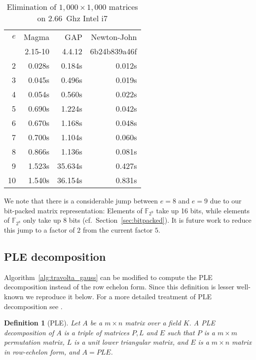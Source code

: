 \documentclass{sig-alternate}
\newcommand{\ring}[1]{\mathbb{#1}}
\newcommand{\F}{\ensuremath{\ring{F}}\xspace}
\newcommand{\mycomputer}{2.66~Ghz Intel i7\xspace}
\newtheorem{definition}{Definition}
\begin{document}
\begin{table}[ht]
\begin{small}
\begin{center}
\begin{tabular}{|r|r|r|r|}
\hline
 $e$ & Magma & GAP & Newton-John \\
     & {\footnotesize 2.15-10} & {\footnotesize 4.4.12} & {\footnotesize 6b24b839a46f}\\
\hline
 2 & 0.028s &  0.184s & 0.012s\\
 3 & 0.045s &  0.496s & 0.019s\\
 4 & 0.054s &  0.560s & 0.022s\\
 5 & 0.690s &  1.224s & 0.042s\\
 6 & 0.670s &  1.168s & 0.048s\\
 7 & 0.700s &  1.104s & 0.060s\\
 8 & 0.866s &  1.136s & 0.081s\\
 9 & 1.523s & 35.634s & 0.427s\\
10 & 1.540s & 36.154s & 0.831s\\
\hline
\end{tabular}
\end{center}
\end{small}
\caption{Elimination of $1,000 \times 1,000$ matrices on \mycomputer}
\label{tab:travolta_elim_times}
\end{table}

We note that there is a considerable jump between $e=8$ and $e=9$ due to our bit-packed matrix representation: Elements of $\F_{2^9}$ take up 16 bits, while elements of $\F_{2^8}$ only take up 8 bits (cf.\ Section~\ref{sec:bitpacked}). It is future work to reduce this jump to a factor of $2$ from the current factor $5$.

\subsection{PLE decomposition} \label{sec:ple}

Algorithm~\ref{alg:travolta_gauss} can be modified to compute the PLE decomposition instead of the row echelon form. Since this definition is lesser well-known we reproduce it below. For a more detailed treatment of PLE decomposition see \cite{jeannerod-pernet-storjohann:cup2012}.

\begin{definition}[PLE]
Let $A$ be a $m\times n$ matrix over a field $K$. A PLE decomposition of $A$ is a triple of matrices $P,L$ and $E$ such that $P$ is a $m\times m$ permutation matrix, $L$ is a unit lower triangular matrix, and $E$ is a $m\times n$ matrix in row-echelon form, and $A=PLE$.
\end{definition}
\end{document}
